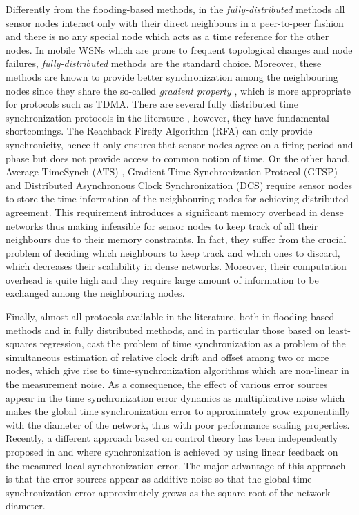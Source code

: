 \documentclass[english,a4paper,10pt,final]{article}
\numberwithin{equation}{section}
\numberwithin{figure}{section}
\begin{document}
Differently from the flooding-based methods, in the \emph{fully-distributed} methods all sensor nodes interact only with their direct neighbours in a peer-to-peer fashion and there is no any special node which acts as a time reference for the other nodes. In mobile WSNs which are prone to frequent topological changes and node failures, \emph{fully-distributed} methods are the standard choice. Moreover, these methods are known to provide better synchronization among the neighbouring nodes since they share the so-called \textit{gradient property} \cite{Fan2006}, which is more appropriate for protocols such as TDMA. There are several fully distributed time synchronization protocols in the literature \cite{Firefly,Sommer2009Gradient,SchenatoFiorentin:2011,Choi:12}, however, they have fundamental shortcomings. The Reachback Firefly Algorithm (RFA)\cite{Firefly} can only provide synchronicity, hence it only ensures that sensor nodes agree on a firing period and phase but does not provide access to common notion of time. On the other hand, Average TimeSynch (ATS) \cite{SchenatoFiorentin:2011}, Gradient Time Synchronization Protocol (GTSP)\cite{Sommer2009Gradient} and Distributed Asynchronous Clock
Synchronization (DCS) \cite{Choi:12} require sensor nodes to store the time information of the neighbouring nodes for achieving distributed agreement. This requirement introduces a significant memory overhead in dense networks thus making infeasible for sensor nodes to keep track of all their neighbours due to their memory constraints. In fact, they suffer from the crucial problem of deciding which neighbours to keep track and which ones to discard, which decreases their scalability in dense networks. Moreover, their computation overhead is quite high and they require large amount of information to be exchanged among the neighbouring nodes. 

Finally, almost all protocols available in the literature, both in flooding-based methods and in fully distributed methods, and in particular those based on least-squares regression, cast the problem of time synchronization as a problem of the simultaneous estimation of relative clock drift and offset among two or more nodes, which give rise to time-synchronization algorithms  which are non-linear in the measurement noise. As a consequence, the effect of various error sources appear in the time synchronization error dynamics as multiplicative noise which makes the global time synchronization error to approximately grow exponentially with the diameter of the network, thus with poor performance scaling properties. Recently, a different approach based on control theory has been independently proposed in \cite{Chen:10} and \cite{Carli_2011} where synchronization is achieved by using linear feedback on the measured local synchronization error. The major advantage of this approach is that the  error sources appear as additive noise so that the global time synchronization error approximately grows as the square root of the network diameter.    
\end{document}
